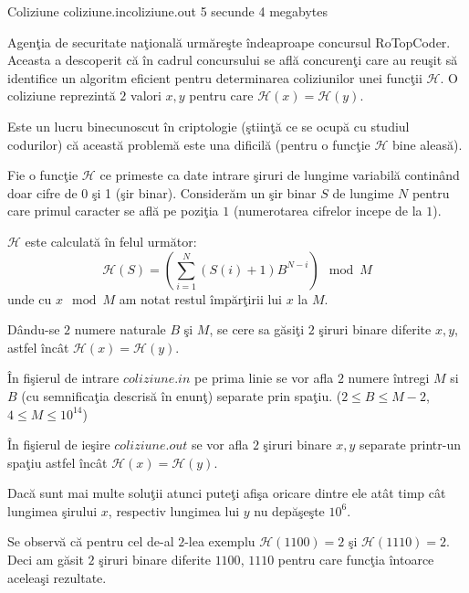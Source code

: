 \begin{problem}{Coliziune}
{coliziune.in}{coliziune.out}
{5 secunde} {4 megabytes}{}

Agen\c{t}ia de securitate na\c{t}ional\u{a} urm\u{a}re\c{s}te \^{i}ndeaproape concursul RoTopCoder. Aceasta a descoperit c\u{a} \^{i}n cadrul concursului se afl\u{a} concuren\c{t}i care au reu\c{s}it s\u{a} identifice un algoritm eficient pentru determinarea coliziunilor unei func\c{t}ii $\mathcal{H}$.
O coliziune reprezint\u{a} $2$ valori $x, y$ pentru care $\mathcal{H}(x) = \mathcal{H}(y)$.

Este un lucru binecunoscut \^{i}n criptologie (\c{s}tiin\c{t}\u{a} ce se ocup\u{a} cu studiul codurilor) c\u{a} aceast\u{a} problem\u{a} este una dificil\u{a} (pentru o func\c{t}ie $\mathcal{H}$ bine aleas\u{a}).

Fie o func\c{t}ie $\mathcal{H}$ ce primeste ca date intrare \c{s}iruri de lungime variabil\u{a} contin\^{a}nd doar cifre de 0 \c{s}i 1 (\c{s}ir binar). Consider\u{a}m un \c{s}ir binar $S$ de lungime $N$ pentru care primul caracter se afl\u{a} pe pozi\c{t}ia $1$ (numerotarea cifrelor incepe de la $1$).

$\mathcal{H}$ este calculat\u{a} \^{i}n felul urm\u{a}tor:
\begin{equation}
\mathcal{H}(S) = (\displaystyle\sum_{i = 1}^{N}{(S(i) + 1) B ^{N - i}}) \mod M
\end{equation}
unde cu $x \mod M$ am notat restul \^{i}mp\u{a}r\c{t}irii lui $x$ la $M$.

D\^{a}ndu-se $2$ numere naturale $B$ \c{s}i $M$, se cere sa g\u{a}si\c{t}i $2$ \c{s}iruri binare diferite $x, y$, astfel \^{i}nc\^{a}t $\mathcal{H}(x) = \mathcal{H}(y)$.

\InputFile

\^{I}n fi\c{s}ierul de intrare $coliziune.in$ pe prima linie se vor afla $2$ numere întregi $M$ si $B$ (cu semnifica\c{t}ia descris\u{a} \^{i}n enun\c{t}) separate prin spa\c{t}iu. ($2 \le B \le M-2$, $4 \le M \le 10^{14}$)

\OutputFile

În fişierul de ie\c{s}ire $coliziune.out$ se vor afla $2$ \c{s}iruri binare $x, y$ separate printr-un spa\c{t}iu astfel \^{i}nc\^a{t} $\mathcal{H}(x) = \mathcal{H}(y)$.

\Note

Dac\u{a} sunt mai multe solu\c{t}ii atunci pute\c{t}i afi\c{s}a oricare dintre ele at\^{a}t timp c\^{a}t lungimea \c{s}irului $x$, respectiv lungimea lui $y$ nu dep\u{a}\c{s}e\c{s}te $10^6$.

\Examples

\begin{example}
%
%
\end{example}

\Explanations

Se observ\u{a} c\u{a} pentru cel de-al $2$-lea exemplu $\mathcal{H}(1100) = 2$ \c{s}i $\mathcal{H}(1110) = 2$. Deci am g\u{a}sit $2$ \c{s}iruri binare diferite $1100$, $1110$ pentru care func\c{t}ia \^{i}ntoarce acelea\c{s}i rezultate.

\end{problem}
